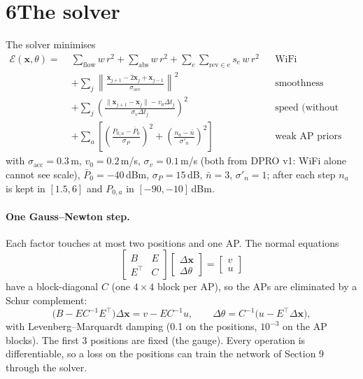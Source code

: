 \documentclass[11pt]{article}
\newcommand{\x}{\mathbf{x}}
\begin{document}
\section*{6\quad The solver}
The solver minimises
\begin{align}
\mathcal{E}(\x,\theta)=\;&\sum_{\text{flow}}w\,r^2+\sum_{\text{abs}}w\,r^2+\sum_{e}\sum_{\text{rev}\in e}s_e\,w\,r^2
&&\text{WiFi}\nonumber\\
&+\sum_{j}\left\lVert\frac{\x_{j+1}-2\x_j+\x_{j-1}}{\sigma_{\text{acc}}}\right\rVert^2
&&\text{smoothness (without odometry)}\nonumber\\
&+\sum_{j}\left(\frac{\lVert\x_{j+1}-\x_j\rVert-v_0\Delta t_j}{\sigma_v\Delta t_j}\right)^{\!2}
&&\text{speed (without odometry)}\nonumber\\
&+\sum_a\left[\left(\frac{P_{0,a}-\bar P_0}{\sigma_P}\right)^{\!2}+\left(\frac{n_a-\bar n}{\sigma'_n}\right)^{\!2}\right]
&&\text{weak AP priors}
\end{align}
with $\sigma_{\text{acc}}=0.3$\,m, $v_0=0.2$\,m/s, $\sigma_v=0.1$\,m/s (both from DPRO v1: WiFi alone cannot
see scale), $\bar P_0=-40$\,dBm, $\sigma_P=15$\,dB, $\bar n=3$, $\sigma'_n=1$; after each step $n_a$ is kept in
$[1.5,6]$ and $P_{0,a}$ in $[-90,-10]$\,dBm.

\paragraph{One Gauss--Newton step.} Each factor touches at most two positions and one AP. The normal equations
\begin{equation}
\begin{bmatrix} B & E\\ E^\top & C\end{bmatrix}\begin{bmatrix}\Delta\x\\ \Delta\theta\end{bmatrix}=\begin{bmatrix} v\\ u\end{bmatrix}
\end{equation}
have a block-diagonal $C$ (one $4\times4$ block per AP), so the APs are eliminated by a Schur complement:
\begin{equation}
\big(B-EC^{-1}E^\top\big)\Delta\x=v-EC^{-1}u,\qquad \Delta\theta=C^{-1}\big(u-E^\top\Delta\x\big),
\end{equation}
with Levenberg--Marquardt damping (0.1 on the positions, $10^{-3}$ on the AP blocks). The first 3 positions
are fixed (the gauge). Every operation is differentiable, so a loss on the positions can train the network
of Section 9 through the solver.
\end{document}
